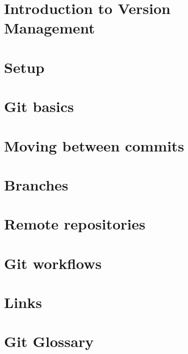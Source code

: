 \documentclass[b5paper,openany]{book}
\begin{document}
\tp

\tableofcontents




\chapter{Introduction to Version Management}


\chapter{Setup}


\chapter{Git basics}


\chapter{Moving between commits}


\chapter{Branches}


\chapter{Remote repositories}


\chapter{Git workflows}


\chapter{Links}


\chapter{Git Glossary}

\end{document}
